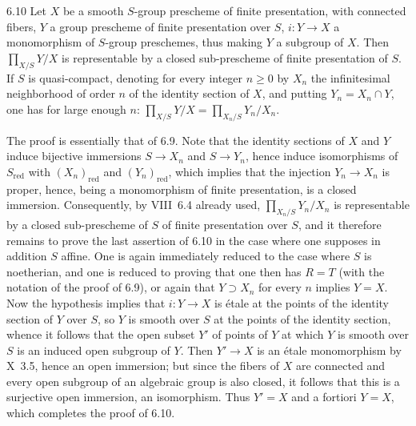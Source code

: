 \begin{corollary}{6.10}\label{XI.6.10}
Let $X$ be a smooth $S$-group prescheme of finite presentation, with connected fibers, $Y$ a group prescheme of finite presentation over $S$, $i:Y\to X$ a monomorphism of $S$-group preschemes, thus making $Y$ a subgroup of $X$. Then $\prod_{X/S}Y/X$ is representable by a closed sub-prescheme of finite presentation of $S$. If $S$ is quasi-compact, denoting for every integer $n\ge0$ by $X_n$ the infinitesimal neighborhood of order $n$ of the identity section of $X$, and putting $Y_n=X_n\cap Y$, one has for large enough $n$: $\prod_{X/S}Y/X=\prod_{X_n/S}Y_n/X_n$.
\end{corollary}
The proof is essentially that of 6.9. Note that the identity sections of $X$ and $Y$ induce bijective immersions $S\to X_n$ and $S\to Y_n$, hence induce isomorphisms of $S_{\mathrm{red}}$ with $(X_n)_{\mathrm{red}}$ and $(Y_n)_{\mathrm{red}}$, which implies that the injection $Y_n\to X_n$ is proper, hence, being a monomorphism of finite presentation, is a closed immersion. Consequently, by VIII~6.4 already used, $\prod_{X_n/S}Y_n/X_n$ is representable by a closed sub-prescheme of $S$ of finite presentation over $S$, and it therefore remains to prove the last assertion of 6.10 in the case where one supposes in addition $S$ affine. One is again immediately reduced to the case where $S$ is noetherian, and one is reduced to proving that one then has $R=T$ (with the notation of the proof of 6.9), or again that $Y\supset X_n$ for every $n$ implies $Y=X$. Now the hypothesis implies that $i:Y\to X$ is étale at the points of the identity section of $Y$ over $S$, so $Y$ is smooth over $S$ at the points of the identity section, whence it follows that the open subset $Y'$ of points of $Y$ at which $Y$ is smooth over $S$ is an induced open subgroup of $Y$. Then $Y'\to X$ is an étale monomorphism by X~3.5, hence an open immersion; but since the fibers of $X$ are connected and every open subgroup of an algebraic group is also closed, it follows that this is a surjective open immersion, \ie an isomorphism. Thus $Y'=X$ and a fortiori $Y=X$, which completes the proof of 6.10.

